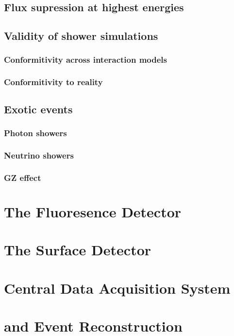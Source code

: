 \subsection{Flux supression at highest energies}
\subsection{Validity of shower simulations}
\subsubsection{Conformitivity across interaction models}
\subsubsection{Conformitivity to reality}
\subsection{Exotic events}
\subsubsection{Photon showers}
\subsubsection{Neutrino showers}
\subsubsection{GZ effect}

\section{The Fluoresence Detector}
\label{sec:fd}



\section{The Surface Detector}
\label{sec:sd}



\section{Central Data Acquisition System}
\label{sec:cdas}



\section{\Offline and Event Reconstruction}
\label{sec:rec}

